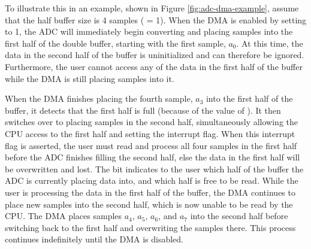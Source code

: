 To illustrate this in an example, shown in Figure \ref{fig:adc-dma-example}, assume that the half buffer size is 4 samples ( = 1). When the DMA is enabled by setting  to 1, the ADC will immediately begin converting and placing samples into the first half of the double buffer, starting with the first sample, $a_0$. At this time, the data in the second half of the buffer is uninitialized and can therefore be ignored. Furthermore, the user cannot access any of the data in the first half of the buffer while the DMA is still placing samples into it.

When the DMA finishes placing the fourth sample, $a_3$ into the first half of the buffer, it detects that the first half is full (because of the value of ). It then switches over to placing samples in the second half, simultaneously allowing the CPU access to the first half and setting the  interrupt flag. When this interrupt flag is asserted, the user must read and process all four samples in the first half before the ADC finishes filling the second half, else the data in the first half will be overwritten and lost. The  bit indicates to the user which half of the buffer the ADC is currently placing data into, and which half is free to be read. While the user is processing the data in the first half of the buffer, the DMA continues to place new samples into the second half, which is now unable to be read by the CPU. The DMA places samples $a_4$, $a_5$, $a_6$, and $a_7$ into the second half before switching back to the first half and overwriting the samples there. This process continues indefinitely until the DMA is disabled.

